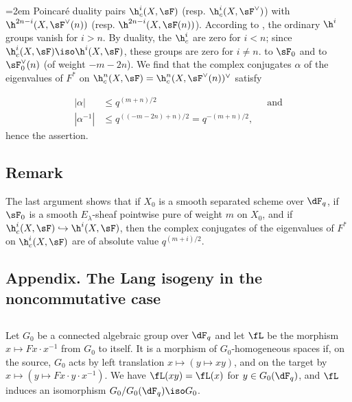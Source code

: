 \begingroup
\emergencystretch=2em\relax
Poincaré duality pairs $\h_c^i(X,\sF)$ (resp. 
$\h_c^i(X,\sF^\vee)$) with $\h^{2n-i}(X,\sF^\vee(n))$ (resp. 
$\h^{2n-i}(X,\sF(n))$). According to , the ordinary $\h^i$ groups 
vanish for $i>n$. By duality, the $\h_c^i$ are zero for $i<n$; since 
$\h_c^i(X,\sF) \iso \h^i(X,\sF)$, these groups are zero for $i\ne n$. 
 to $\sF_0$ and to $\sF_0^\vee(n)$ (of weight 
$-m-2n$). We find that the complex conjugates $\alpha$ of the eigenvalues 
of $F^\ast$ on $\h_c^n(X,\sF) = \h_c^n(X,\sF^\vee(n))^\vee$ satisfy\par
\endgroup 
\begin{align*}
  |\alpha| &\leqslant q^{(m+n)/2} && \text{and} \\
  |\alpha^{-1}| &\leqslant q^{((-m-2n)+n)/2} = q^{-(m+n)/2} \text{,}
\end{align*}
hence the assertion. 





\subsection{Remark}\label{VI:1-21}

The last argument shows that if $X_0$ is a smooth separated scheme over 
$\dF_q$, if $\sF_0$ is a smooth $E_\lambda$-sheaf pointwise pure of weight 
$m$ on $X_0$, and if $\h_c^i(X,\sF) \hookrightarrow \h^i(X,\sF)$, then the 
complex conjugates of the eigenvalues of $F^\ast$ on $\h_c^i(X,\sF)$ are 
of absolute value $q^{(m+i)/2}$. 






\subsection*{Appendix. The Lang isogeny in the noncommutative case}




\subsection{}\label{VI:1-22}

Let $G_0$ be a connected algebraic group over $\dF_q$ and let $\fL$ be the morphism 
$x\mapsto F x\cdot x^{-1}$ from $G_0$ to itself. It is a morphism of 
$G_0$-homogeneous spaces if, on the source, $G_0$ acts by left translation 
$x\mapsto (y\mapsto x y)$, and on the target by 
$x\mapsto (y\mapsto F x\cdot y\cdot x^{-1})$. We have $\fL(xy) = \fL(x)$ for 
$y\in G_0(\dF_q)$, and $\fL$ induces an isomorphism $G_0/G_0(\dF_q)\iso G_0$. 

